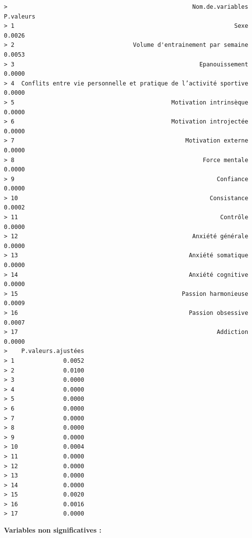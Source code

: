 \documentclass[
]{article}
\begin{document}
\begin{verbatim}
>                                                     Nom.de.variables P.valeurs
> 1                                                               Sexe    0.0026
> 2                                  Volume d'entrainement par semaine    0.0053
> 3                                                     Epanouissement    0.0000
> 4  Conflits entre vie personnelle et pratique de l’activité sportive    0.0000
> 5                                             Motivation intrinsèque    0.0000
> 6                                             Motivation introjectée    0.0000
> 7                                                 Motivation externe    0.0000
> 8                                                      Force mentale    0.0000
> 9                                                          Confiance    0.0000
> 10                                                       Consistance    0.0002
> 11                                                          Contrôle    0.0000
> 12                                                  Anxiété générale    0.0000
> 13                                                 Anxiété somatique    0.0000
> 14                                                 Anxiété cognitive    0.0000
> 15                                               Passion harmonieuse    0.0009
> 16                                                 Passion obsessive    0.0007
> 17                                                         Addiction    0.0000
>    P.valeurs.ajustées
> 1              0.0052
> 2              0.0100
> 3              0.0000
> 4              0.0000
> 5              0.0000
> 6              0.0000
> 7              0.0000
> 8              0.0000
> 9              0.0000
> 10             0.0004
> 11             0.0000
> 12             0.0000
> 13             0.0000
> 14             0.0000
> 15             0.0020
> 16             0.0016
> 17             0.0000
\end{verbatim}

\textbf{Variables non significatives :}
\end{document}
